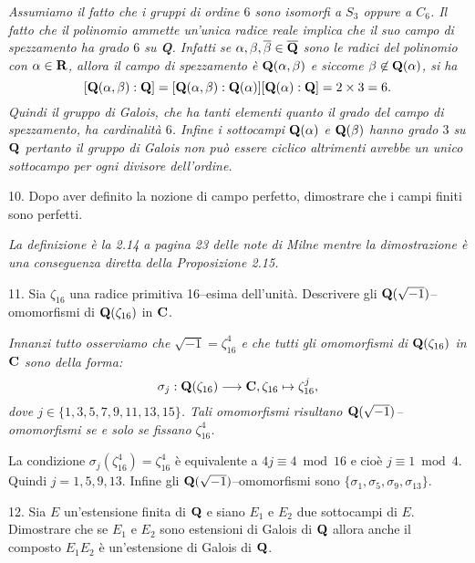 \smallskip{} \it Assumiamo il fatto che i
gruppi di ordine $6$ sono isomorfi a $S_3$ oppure a $C_6$. Il
fatto che il polinomio ammette un'unica radice reale implica che
il suo campo di spezzamento ha grado $6$ su {\bf Q}. Infatti se
$\alpha, \beta, \overline{\beta}\in{\overline{\bf Q}}$ sono le
radici del polinomio con $\alpha\in{\bf R}$, allora il campo di
spezzamento \`e ${\bf Q}(\alpha,\beta)$ e siccome
$\beta\not\in{\bf Q}(\alpha)$, si ha
$$[{\bf Q}(\alpha,\beta):{\bf Q}]=[{\bf Q}(\alpha,\beta):{\bf Q}(\alpha)]
[{\bf Q}(\alpha):{\bf Q}]=2\times 3=6.$$ Quindi il gruppo di Galois,
che ha tanti elementi quanto il grado del campo di spezzamento, ha
cardinalit\`{a} $6$.  Infine i sottocampi ${\bf Q}(\alpha)$ e ${\bf
Q}(\beta)$ hanno grado $3$ su ${\bf Q}$ pertanto il gruppo di Galois
non pu\`{o} essere ciclico altrimenti avrebbe un unico sottocampo
per ogni divisore dell'ordine.\rm
\bigskip

\item{10.} Dopo aver definito la nozione di campo perfetto,
dimostrare che i campi finiti sono perfetti.

\smallskip{} \it La definizione \`{e} la 2.14
a pagina 23 delle note di Milne mentre la dimostrazione \`{e} una conseguenza diretta
della Proposizione 2.15.\rm
\bigskip

\item{11.} Sia $\zeta_{16}$ una radice primitiva 16--esima
dell'unit\`a. Descrivere gli ${\bf Q}(\sqrt{-1})$--omomorfismi di
${\bf Q}(\zeta_{16})$ in ${\bf C}$.

\smallskip{} \it Innanzi tutto osserviamo che
$\sqrt{-1}=\zeta_{16}^4$ e che tutti gli omomorfismi di ${\bf
Q}(\zeta_{16})$ in ${\bf C}$ sono della forma:
$$\sigma_j:{\bf Q}(\zeta_{16})\longrightarrow{\bf C},
\zeta_{16}\mapsto\zeta_{16}^j,$$ dove
$j\in\{1,3,5,7,9,11,13,15\}$. Tali omomorfismi risultano ${\bf
Q}(\sqrt{-1})$--omomorfismi se e solo se fissano $\zeta_{16}^4$.

La condizione $\sigma_j(\zeta_{16}^4)=\zeta_{16}^4$ \`e
equivalente a $4j\equiv 4\bmod16$ e cio\`e $j\equiv1\bmod4$.
Quindi $j=1,5,9,13$. Infine gli ${\bf Q}(\sqrt{-1})$--omomorfismi
sono $\{\sigma_1,\sigma_5,\sigma_9,\sigma_{13}\}$.\rm
\bigskip

\item{12.} Sia $E$ un'estensione finita di ${\bf Q}$ e siano
 $E_1$ e $E_2$ due sottocampi di $E$. Dimostrare che se $E_1$ e $E_2$ sono
 estensioni di Galois di ${\bf Q}$ allora anche il composto $E_1E_2$ \`{e}
 un'estensione di Galois di ${\bf Q}$.


